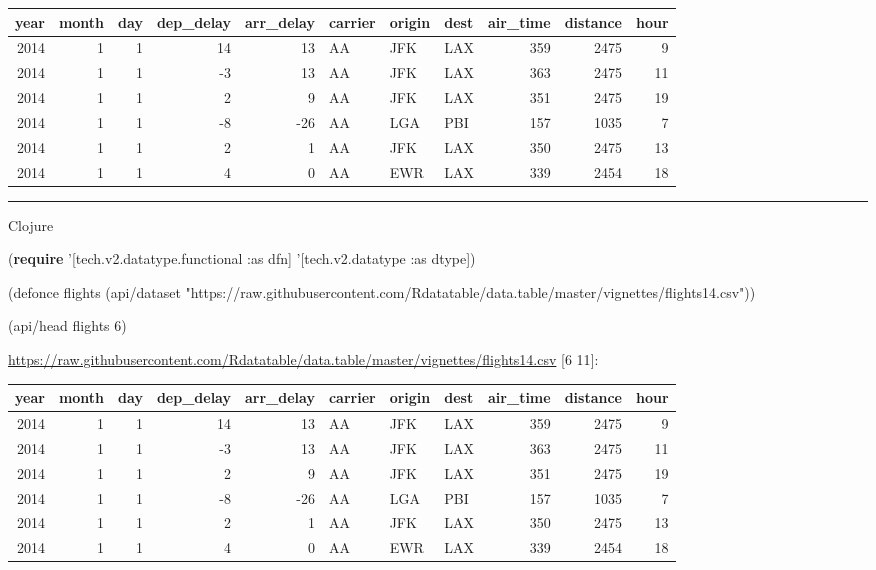 \documentclass[]{article}
\newenvironment{Shaded}{\begin{snugshade}}{\end{snugshade}}
\newcommand{\KeywordTok}[1]{\textcolor[rgb]{0.13,0.29,0.53}{\textbf{#1}}}
\newcommand{\DecValTok}[1]{\textcolor[rgb]{0.00,0.00,0.81}{#1}}
\newcommand{\StringTok}[1]{\textcolor[rgb]{0.31,0.60,0.02}{#1}}
\newcommand{\FunctionTok}[1]{\textcolor[rgb]{0.00,0.00,0.00}{#1}}
\newcommand{\BuiltInTok}[1]{#1}
\newcommand{\AttributeTok}[1]{\textcolor[rgb]{0.77,0.63,0.00}{#1}}
\newcommand{\NormalTok}[1]{#1}
\begin{document}
\begin{longtable}[]{@{}rrrrrlllrrr@{}}
\toprule
year & month & day & dep\_delay & arr\_delay & carrier & origin & dest &
air\_time & distance & hour\tabularnewline
\midrule
\endhead
2014 & 1 & 1 & 14 & 13 & AA & JFK & LAX & 359 & 2475 & 9\tabularnewline
2014 & 1 & 1 & -3 & 13 & AA & JFK & LAX & 363 & 2475 & 11\tabularnewline
2014 & 1 & 1 & 2 & 9 & AA & JFK & LAX & 351 & 2475 & 19\tabularnewline
2014 & 1 & 1 & -8 & -26 & AA & LGA & PBI & 157 & 1035 & 7\tabularnewline
2014 & 1 & 1 & 2 & 1 & AA & JFK & LAX & 350 & 2475 & 13\tabularnewline
2014 & 1 & 1 & 4 & 0 & AA & EWR & LAX & 339 & 2454 & 18\tabularnewline
\bottomrule
\end{longtable}

\begin{center}\rule{0.5\linewidth}{0.5pt}\end{center}

Clojure

\begin{Shaded}
\begin{Highlighting}[]
\NormalTok{(}\KeywordTok{require}\NormalTok{ '[tech.v2.datatype.functional }\AttributeTok{:as}\NormalTok{ dfn]}
\NormalTok{         '[tech.v2.datatype }\AttributeTok{:as}\NormalTok{ dtype])}

\NormalTok{(}\BuiltInTok{defonce}\FunctionTok{ flights }\NormalTok{(api/dataset }\StringTok{"https://raw.githubusercontent.com/Rdatatable/data.table/master/vignettes/flights14.csv"}\NormalTok{))}
\end{Highlighting}
\end{Shaded}

\begin{Shaded}
\begin{Highlighting}[]
\NormalTok{(api/head flights }\DecValTok{6}\NormalTok{)}
\end{Highlighting}
\end{Shaded}

\url{https://raw.githubusercontent.com/Rdatatable/data.table/master/vignettes/flights14.csv}
{[}6 11{]}:

\begin{longtable}[]{@{}rrrrrlllrrr@{}}
\toprule
year & month & day & dep\_delay & arr\_delay & carrier & origin & dest &
air\_time & distance & hour\tabularnewline
\midrule
\endhead
2014 & 1 & 1 & 14 & 13 & AA & JFK & LAX & 359 & 2475 & 9\tabularnewline
2014 & 1 & 1 & -3 & 13 & AA & JFK & LAX & 363 & 2475 & 11\tabularnewline
2014 & 1 & 1 & 2 & 9 & AA & JFK & LAX & 351 & 2475 & 19\tabularnewline
2014 & 1 & 1 & -8 & -26 & AA & LGA & PBI & 157 & 1035 & 7\tabularnewline
2014 & 1 & 1 & 2 & 1 & AA & JFK & LAX & 350 & 2475 & 13\tabularnewline
2014 & 1 & 1 & 4 & 0 & AA & EWR & LAX & 339 & 2454 & 18\tabularnewline
\bottomrule
\end{longtable}
\end{document}
